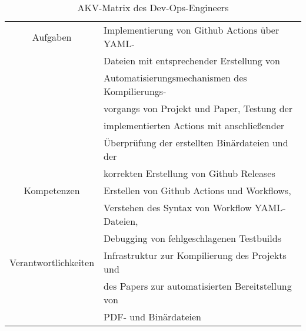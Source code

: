\begin{table}[H]
    \begin{center}
        \label{tab:devopsengineer}
        \begin{tabular}{|c||p{9cm}|}
            \hline
            Aufgaben & Implementierung von Github Actions über YAML- \\
            & Dateien mit entsprechender Erstellung von \\
            & Automatisierungsmechanismen des Kompilierungs- \\ 
            & vorgangs von Projekt und Paper, Testung der\\
            & implementierten Actions mit anschließender \\
            & Überprüfung der erstellten Binärdateien und der \\
            & korrekten Erstellung von Github Releases \\
            \hline
            Kompetenzen & Erstellen von Github Actions und Workflows,  \\
            & Verstehen des Syntax von Workflow YAML-Dateien, \\
            & Debugging von fehlgeschlagenen Testbuilds \\
            \hline
            Verantwortlichkeiten & Infrastruktur zur Kompilierung des Projekts und \\
            & des Papers zur automatisierten Bereitstellung von \\
            & PDF- und Binärdateien \\
            \hline
        \end{tabular}
        \caption{AKV-Matrix des Dev-Ops-Engineers}
    \end{center}
\end{table}
